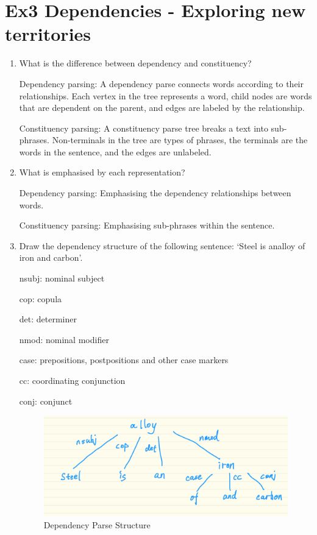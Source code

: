 \documentclass[12pt]{article}
\begin{document}
{\section{Ex3 Dependencies - Exploring new territories}
\label{sec: ex3}
\begin{enumerate}[1.]
	\item What is the difference between dependency and constituency? 
	
	Dependency parsing: A dependency parse connects words according to their relationships. 
	Each vertex in the tree represents a word, child nodes are words that are dependent on the parent, 
	and edges are labeled by the relationship.
	
	Constituency parsing: A constituency parse tree breaks a text into sub-phrases. 
	Non-terminals in the tree are types of phrases, the terminals are the words in the sentence, 
	and the edges are unlabeled.
	\item What is emphasised by each representation?
	
	Dependency parsing: Emphasising the dependency relationships between words.

	Constituency parsing: Emphasising sub-phrases within the sentence.
	\item Draw the dependency structure of the following sentence: ‘Steel is analloy of iron and carbon’.
	
	nsubj: nominal subject

	cop: copula

	det: determiner

	nmod: nominal modifier

	case: prepositions, postpositions and other case markers

	cc: coordinating conjunction

	conj: conjunct

	\begin{figure}[ht]
		\centering
		\includegraphics[scale=0.2]{figs/dependency_parse.jpg}
		\caption{Dependency Parse Structure}
		\label{fig:label1}
	\end{figure}


\end{enumerate}}
\end{document}
